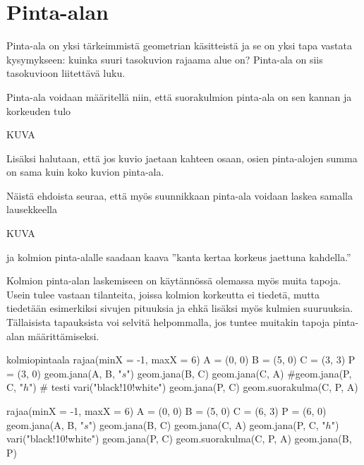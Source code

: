 \section*{Pinta-alan} %

Pinta-ala on yksi tärkeimmistä geometrian käsitteistä ja se on yksi tapa vastata kysymykseen: kuinka suuri tasokuvion rajaama alue on? Pinta-ala on siis tasokuvioon liitettävä luku.

Pinta-ala voidaan määritellä niin, että suorakulmion pinta-ala on sen kannan ja korkeuden tulo

KUVA

Lisäksi halutaan, että jos kuvio jaetaan kahteen osaan, osien pinta-alojen summa on sama kuin koko kuvion pinta-ala.

Näistä ehdoista seuraa, että myös suunnikkaan pinta-ala voidaan laskea samalla lausekkeella

KUVA

ja kolmion pinta-alalle saadaan kaava ''kanta kertaa korkeus jaettuna kahdella.''

Kolmion pinta-alan laskemiseen on käytännössä olemassa myös muita tapoja. Usein tulee vastaan tilanteita, joissa kolmion korkeutta ei tiedetä, mutta tiedetään esimerkiksi sivujen pituuksia ja ehkä lisäksi myös kulmien suuruuksia. Tällaisista tapauksista voi selvitä helpommalla, jos tuntee muitakin tapoja pinta-alan määrittämiseksi.

\begin{luoKuva}{kolmiopintaala}
        rajaa(minX = -1, maxX = 6)
        A = (0, 0)
        B = (5, 0)
        C = (3, 3)
        P = (3, 0)
        geom.jana(A, B, "$s$")
        geom.jana(B, C)
        geom.jana(C, A)
        #geom.jana(P, C, "$h$") # testi
        vari("black!10!white")
        geom.jana(P, C) 
        geom.suorakulma(C, P, A)
\end{luoKuva}


\begin{center}
\begin{kuva}
        rajaa(minX = -1, maxX = 6)
        A = (0, 0)
        B = (5, 0)
        C = (6, 3)
        P = (6, 0)
        geom.jana(A, B, "$s$")
        geom.jana(B, C)
        geom.jana(C, A)
        geom.jana(P, C, "$h$")
        vari("black!10!white")
        geom.jana(P, C)
        geom.suorakulma(C, P, A)
        geom.jana(B, P)
\end{kuva}
\end{center}


